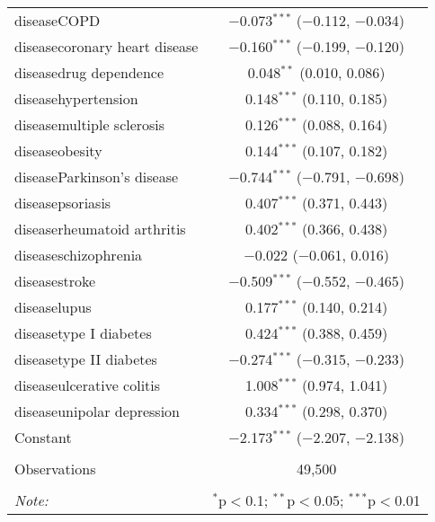 \begin{table}[!htbp]
\begin{tabular}{@{\extracolsep{5pt}}lc}
  diseaseCOPD & $-$0.073$^{***}$ ($-$0.112, $-$0.034) \\ 
  diseasecoronary heart disease & $-$0.160$^{***}$ ($-$0.199, $-$0.120) \\ 
  diseasedrug dependence & 0.048$^{**}$ (0.010, 0.086) \\ 
  diseasehypertension & 0.148$^{***}$ (0.110, 0.185) \\ 
  diseasemultiple sclerosis & 0.126$^{***}$ (0.088, 0.164) \\ 
  diseaseobesity & 0.144$^{***}$ (0.107, 0.182) \\ 
  diseaseParkinson's disease & $-$0.744$^{***}$ ($-$0.791, $-$0.698) \\ 
  diseasepsoriasis & 0.407$^{***}$ (0.371, 0.443) \\ 
  diseaserheumatoid arthritis & 0.402$^{***}$ (0.366, 0.438) \\ 
  diseaseschizophrenia & $-$0.022 ($-$0.061, 0.016) \\ 
  diseasestroke & $-$0.509$^{***}$ ($-$0.552, $-$0.465) \\ 
  diseaselupus & 0.177$^{***}$ (0.140, 0.214) \\ 
  diseasetype I diabetes & 0.424$^{***}$ (0.388, 0.459) \\ 
  diseasetype II diabetes & $-$0.274$^{***}$ ($-$0.315, $-$0.233) \\ 
  diseaseulcerative colitis & 1.008$^{***}$ (0.974, 1.041) \\ 
  diseaseunipolar depression & 0.334$^{***}$ (0.298, 0.370) \\ 
  Constant & $-$2.173$^{***}$ ($-$2.207, $-$2.138) \\ 
 \hline \\[-1.8ex] 
Observations & 49,500 \\ 
\hline 
\hline \\[-1.8ex] 
\textit{Note:}  & \multicolumn{1}{r}{$^{*}$p$<$0.1; $^{**}$p$<$0.05; $^{***}$p$<$0.01} \\ 
\end{tabular} 
\end{table} 
